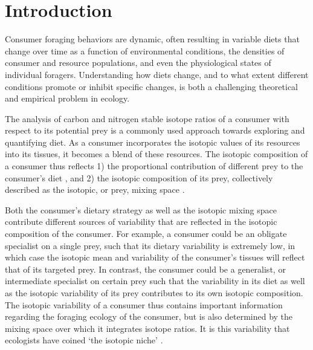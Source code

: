 \documentclass{frontiersSCNS}
\begin{document}
\section{Introduction}

Consumer foraging behaviors are dynamic, often resulting in variable diets that change over time as a function of environmental conditions, the densities of consumer and resource populations, and even the physiological states of individual foragers.
Understanding how diets change, and to what extent different conditions promote or inhibit specific changes, is both a challenging theoretical and empirical problem in ecology.

The analysis of carbon and nitrogen stable isotope ratios of a consumer with respect to its potential prey is a commonly used approach towards exploring and quantifying diet.
As a consumer incorporates the isotopic values of its resources into its tissues, it becomes a blend of these resources.
The isotopic composition of a consumer thus reflects
1) the proportional contribution of different prey to the consumer's diet \citep{Moore:2008kg,Parnell:2010ub}, and
2) the isotopic composition of its prey, collectively described as the isotopic, or prey, mixing space \citep{Phillips:2001ws,Phillips:2002tu,Newsome:2007tz}.

Both the consumer's dietary strategy as well as the isotopic mixing space contribute different sources of variability that are reflected in the isotopic composition of the consumer.
For example, a consumer could be an obligate specialist on a single prey, such that its dietary variability is extremely low, in which case the isotopic mean and variability of the consumer's tissues will reflect that of its targeted prey.
In contrast, the consumer could be a generalist, or intermediate specialist on certain prey such that the variability in its diet as well as the isotopic variability of its prey contributes to its own isotopic composition.
The isotopic variability of a consumer thus contains important information regarding the foraging ecology of the consumer, but is also determined by the mixing space over which it integrates isotope ratios.
It is this variability that ecologists have coined `the isotopic niche' \citep{Bearhop:2004im,Newsome:2007tz,Newsome:WhhVfocb,Jackson:2011kd,delRio:2011p2553}. %
\end{document}
